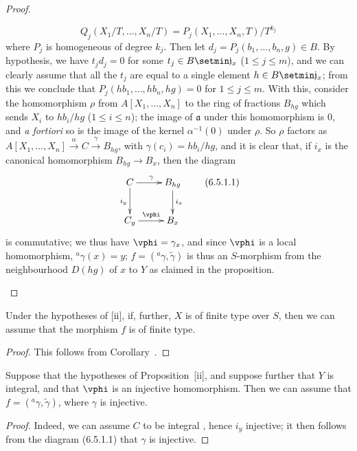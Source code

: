 \begin{proof}
\begin{enumerate}
    \[
      Q_j(X_1/T,\ldots,X_n/T)=P_j(X_1,\ldots,X_n,T)/T^{k_j}
    \]
    where $P_j$ is homogeneous of degree $k_j$.
    Then let $d_j=P_j(b_1,\ldots,b_n,g)\in B$.
    By hypothesis, we have $t_jd_j=0$ for some $t_j\in B\setmin\mathfrak{j}_x$ ($1\leq j\leq m$), and we can clearly assume that all the $t_j$ are equal to a single element $h\in B\setmin\mathfrak{j}_x$;
    from this we conclude that $P_j(hb_1,\ldots,hb_n,hg)=0$ for $1\leq j\leq m$.
    With this, consider the homomorphism $\rho$ from $A[X_1,\ldots,X_n]$ to the ring of fractions $B_{hg}$ which sends $X_i$ to $hb_i/hg$ ($1\leq i\leq n$);
    the image of $\mathfrak{a}$ under this homomorphism is $0$, and \emph{a fortiori} so is the image of the kernel $\alpha^{-1}(0)$ under $\rho$.
    So $\rho$ factors as $A[X_1,\ldots,X_n]\xrightarrow{\alpha}C\xrightarrow{\gamma}B_{hg}$, with $\gamma(c_i)=hb_i/hg$, and it is clear that, if $i_x$ is the canonical homomorphism $B_{hg}\to B_x$, then the diagram
    \[
    \label{I.6.5.1.1}
      \xymatrix{
        C\ar[r]^\gamma\ar[d]_{i_y} &
        B_{hg}\ar[d]^{i_x}\\
        C_y\ar[r]^\vphi &
        B_x
      }
      \tag{6.5.1.1}
    \]
    is commutative; we thus have $\vphi=\gamma_x$, and since $\vphi$ is a local homomorphism, $^a\gamma(x)=y$;
    $f=({}^a\gamma,\widetilde{\gamma})$ is thus an $S$-morphism from the neighbourhood $D(hg)$ of $x$ to $Y$ as claimed in the proposition.
\end{enumerate}
\end{proof}

\begin{corollary}[6.5.2]
\label{I.6.5.2}
Under the hypotheses of [ii], if, further, $X$ is of finite type over $S$, then we can assume that the morphism $f$ is of finite type.
\end{corollary}

\begin{proof}
This follows from Corollary~.
\end{proof}

\begin{corollary}[6.5.3]
\label{I.6.5.3}
Suppose that the hypotheses of Proposition~[ii], and suppose further that $Y$ is integral, and that $\vphi$ is an injective homomorphism.
Then we can assume that $f=({}^a\gamma,\widetilde{\gamma})$, where $\gamma$ is injective.
\end{corollary}

\begin{proof}
Indeed, we can assume $C$ to be integral , hence $i_y$ injective; it then follows from the diagram (6.5.1.1) that $\gamma$ is injective.
\end{proof}

